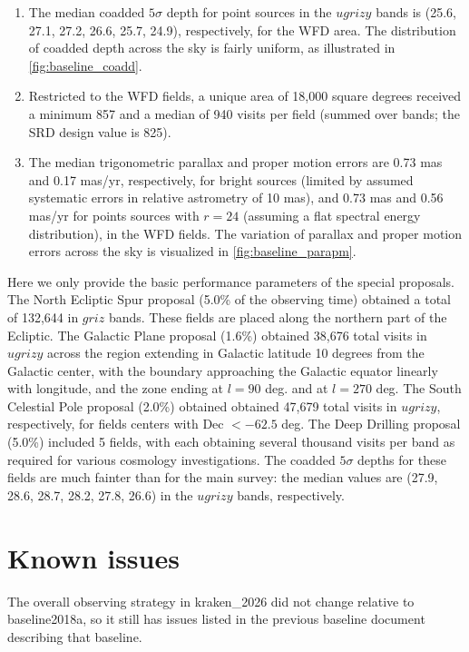 \documentclass[DM,lsstdraft,authoryear,toc]{lsstdoc}
\begin{document}
\begin{enumerate}
\item The median coadded $5\sigma$ depth
for point sources in the $ugrizy$ bands is (25.6, 27.1, 27.2, 26.6,
25.7, 24.9), respectively, for the WFD area. The distribution
of coadded depth across the sky is fairly uniform, as illustrated in \autoref{fig:baseline_coadd}.

\item Restricted to the WFD fields, a unique area of
18,000 square degrees received a minimum 857 and a median of 940 visits per field (summed over bands;
the SRD design value is 825). 

\item The median trigonometric parallax and proper motion errors are
0.73 mas and 0.17 mas/yr, respectively, for bright sources (limited by
assumed systematic errors in relative astrometry of 10 mas), and 0.73
mas and 0.56 mas/yr for points sources with $r=24$ (assuming a flat
spectral energy distribution), in the WFD fields. The variation of parallax
and proper motion errors across the sky is visualized in \autoref{fig:baseline_parapm}.
\end{enumerate}

Here we only provide the basic
performance parameters of the special proposals. 
The North Ecliptic Spur proposal (5.0\% of the observing time) obtained  a total of 132,644 in $griz$ bands. 
These fields are placed along the northern part of the Ecliptic. 
The Galactic Plane proposal (1.6\%) obtained 38,676 total visits in $ugrizy$ 
across the region extending in Galactic latitude 10 degrees
from the Galactic center, with the boundary approaching the Galactic
equator linearly with longitude, and the zone ending at $l=90$ deg.
and at $l=270$ deg. 
The South Celestial Pole proposal (2.0\%) obtained
obtained 47,679 total visits in $ugrizy$, respectively, for fields centers with Dec $<-62.5$ deg. 
The Deep Drilling proposal (5.0\%) included 5 fields, with each obtaining several thousand visits per band 
as required for various cosmology investigations. The coadded $5\sigma$ depths for these fields are much 
fainter than for the main survey: the median values are (27.9, 28.6, 28.7, 28.2, 27.8, 26.6) in the $ugrizy$ bands, respectively.


\section{Known issues}

The overall observing strategy in kraken\_2026 did not change relative to baseline2018a, so it still has issues listed in the
previous baseline document describing that baseline.
\end{document}
